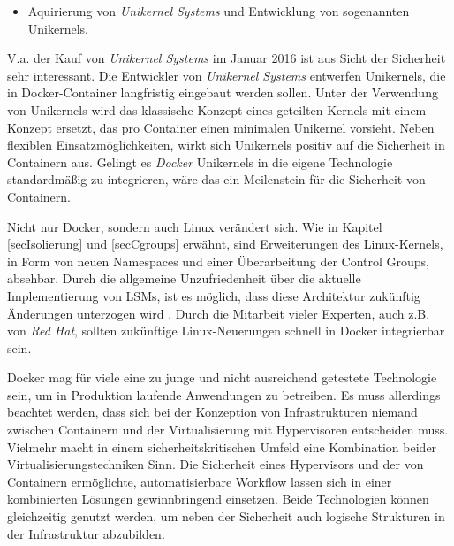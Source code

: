 \documentclass[../main.tex]{subfiles}
\begin{document}
\begin{itemize}
    \item Aquirierung von \emph{Unikernel Systems} und Entwicklung von sogenannten Unikernels. \cite{https://blog.docker.com/2016/01/unikernel/}
  \end{itemize}

  V.a. der Kauf von \emph{Unikernel Systems} im Januar 2016 ist aus Sicht der Sicherheit sehr interessant. Die Entwickler von \emph{Unikernel Systems} entwerfen Unikernels, die in Docker-Container langfristig eingebaut werden sollen. Unter der Verwendung von Unikernels wird das klassische Konzept eines geteilten Kernels mit einem Konzept ersetzt, das pro Container einen minimalen Unikernel vorsieht. Neben flexiblen Einsatzmöglichkeiten, wirkt sich Unikernels positiv auf die Sicherheit in Containern aus. Gelingt es \emph{Docker} Unikernels in die eigene Technologie standardmäßig zu integrieren, wäre das ein Meilenstein für die Sicherheit von Containern.

  Nicht nur Docker, sondern auch Linux verändert sich. Wie in Kapitel \ref{secIsolierung} und \ref{secCgroups} erwähnt, sind Erweiterungen des Linux-Kernels, in Form von neuen Namespaces und einer Überarbeitung der Control Groups, absehbar. Durch die allgemeine Unzufriedenheit über die aktuelle Implementierung von LSMs, ist es möglich, dass diese Architektur zukünftig Änderungen unterzogen wird \cite{https://lwn.net/Articles/443099/}. Durch die Mitarbeit vieler Experten, auch z.B. von \emph{Red Hat}, sollten zukünftige Linux-Neuerungen schnell in Docker integrierbar sein.

  Docker mag für viele eine zu junge und nicht ausreichend getestete Technologie sein, um in Produktion laufende Anwendungen zu betreiben. Es muss allerdings beachtet werden, dass sich bei der Konzeption von Infrastrukturen niemand zwischen Containern und der Virtualisierung mit Hypervisoren entscheiden muss. Vielmehr macht in einem sicherheitskritischen Umfeld eine Kombination beider Virtualisierungstechniken Sinn. Die Sicherheit eines Hypervisors und der von Containern ermöglichte, automatisierbare Workflow lassen sich in einer kombinierten Lösungen gewinnbringend einsetzen. Beide Technologien können gleichzeitig genutzt werden, um neben der Sicherheit auch logische Strukturen in der Infrastruktur abzubilden.


\end{document}
